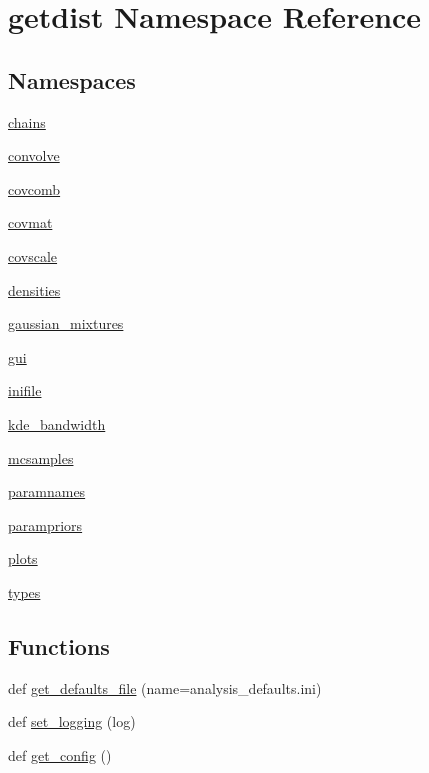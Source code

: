 \hypertarget{namespacegetdist}{}\section{getdist Namespace Reference}
\label{namespacegetdist}
\subsection*{Namespaces}
\begin{DoxyCompactItemize}
\item 
 \mbox{\hyperlink{namespacegetdist_1_1chains}{chains}}
\item 
 \mbox{\hyperlink{namespacegetdist_1_1convolve}{convolve}}
\item 
 \mbox{\hyperlink{namespacegetdist_1_1covcomb}{covcomb}}
\item 
 \mbox{\hyperlink{namespacegetdist_1_1covmat}{covmat}}
\item 
 \mbox{\hyperlink{namespacegetdist_1_1covscale}{covscale}}
\item 
 \mbox{\hyperlink{namespacegetdist_1_1densities}{densities}}
\item 
 \mbox{\hyperlink{namespacegetdist_1_1gaussian__mixtures}{gaussian\+\_\+mixtures}}
\item 
 \mbox{\hyperlink{namespacegetdist_1_1gui}{gui}}
\item 
 \mbox{\hyperlink{namespacegetdist_1_1inifile}{inifile}}
\item 
 \mbox{\hyperlink{namespacegetdist_1_1kde__bandwidth}{kde\+\_\+bandwidth}}
\item 
 \mbox{\hyperlink{namespacegetdist_1_1mcsamples}{mcsamples}}
\item 
 \mbox{\hyperlink{namespacegetdist_1_1paramnames}{paramnames}}
\item 
 \mbox{\hyperlink{namespacegetdist_1_1parampriors}{parampriors}}
\item 
 \mbox{\hyperlink{namespacegetdist_1_1plots}{plots}}
\item 
 \mbox{\hyperlink{namespacegetdist_1_1types}{types}}
\end{DoxyCompactItemize}
\subsection*{Functions}
\begin{DoxyCompactItemize}
\item 
def \mbox{\hyperlink{namespacegetdist_af1887c8e2da86996dd314d3cecb257dc}{get\+\_\+defaults\+\_\+file}} (name=\textquotesingle{}analysis\+\_\+defaults.\+ini\textquotesingle{})
\item 
def \mbox{\hyperlink{namespacegetdist_afff37f2d5a620eda2304d8daa72351c0}{set\+\_\+logging}} (log)
\item 
def \mbox{\hyperlink{namespacegetdist_ae1cef30c152a1bd4e44ee539fd21c3db}{get\+\_\+config}} ()
\end{DoxyCompactItemize}
